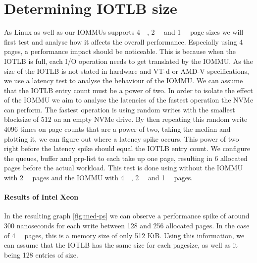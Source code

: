 
\section{Determining IOTLB size}
As Linux as well as our IOMMUs supports \qty{4}{\kibi\byte}, \qty{2}{\mebi\byte} and \qty{1}{\gibi\byte} page sizes we will first test and analyse how it affects the overall performance. Especially using \qty{4}{\kibi\byte} pages, a performance impact should be noticeable. This is because when the IOTLB is full, each I/O operation needs to get translated by the IOMMU.
As the size of the IOTLB is not stated in hardware and VT-d or AMD-V specifications, we use a latency test to analyse the behaviour of the IOMMU. We can assume that the IOTLB entry count must be a power of two. In order to isolate the effect of the IOMMU we aim to analyse the latencies of the fastest operation the NVMe can perform. The fastest operation is using random writes with the smallest blocksize of \qty{512}{\byte} on an empty NVMe drive.
By then repeating this random write 4096 times on page counts that are a power of two, taking the median and plotting it, we can figure out where a latency spike occurs. This power of two right before the latency spike should equal the IOTLB entry count. We configure the queues, buffer and prp-list to each take up one page, resulting in 6 allocated pages before the actual workload. This test is done using without the IOMMU with \qty{2}{\mebi\byte} pages and the IOMMU with \qty{4}{\kibi\byte}, \qty{2}{\mebi\byte} and \qty{1}{\gibi\byte} pages.

\paragraph{Results of Intel Xeon}

In the resulting graph \autoref{fig:med-ps} we can observe a performance spike of around 300 nanoseconds for each write between 128 and 256 allocated pages. In the case of \qty{4}{\kibi\byte} pages, this is a memory size of only 512 KiB. Using this information, we can assume that the IOTLB has the same size for each pagesize, as well as it being 128 entries of size.

